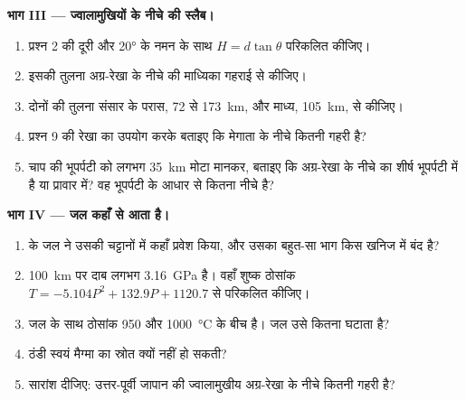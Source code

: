 \begin{problem}[{सप्ताहांत समस्या --- जापान के ज्वालामुखियों के नीचे}]
\medskip
\noindent\textbf{भाग III --- ज्वालामुखियों के नीचे की स्लैब।}
\begin{enumerate}[resume]
  \item प्रश्न 2 की दूरी और \ang{20} के नमन के साथ $H = d\tan\theta$
        परिकलित कीजिए।
  \item इसकी तुलना अग्र-रेखा के नीचे की माध्यिका गहराई से कीजिए।
  \item दोनों की तुलना संसार के परास, 72 से \qty{173}{km}, और माध्य,
        \qty{105}{km}, से कीजिए।
  \item प्रश्न 9 की रेखा का उपयोग करके बताइए कि मेगाता के नीचे  कितनी गहरी है?
  \item चाप की भूपर्पटी को लगभग \qty{35}{km} मोटा मानकर, बताइए कि
        अग्र-रेखा के नीचे  का शीर्ष भूपर्पटी में है या प्रावार में? वह
        भूपर्पटी के आधार से कितना नीचे है?
\end{enumerate}

\medskip
\noindent\textbf{भाग IV --- जल कहाँ से आता है।}
\begin{enumerate}[resume]
  \item {} के जल ने उसकी चट्टानों में कहाँ प्रवेश किया, और उसका बहुत-सा भाग किस
        खनिज में बंद है?
  \item \qty{100}{km} पर दाब लगभग \qty{3.16}{GPa} है। वहाँ शुष्क ठोसांक
        $T = -5.104P^2 + 132.9P + 1120.7$ से परिकलित कीजिए।
  \item जल के साथ ठोसांक 950 और \qty{1000}{\celsius} के बीच है।
        जल उसे कितना घटाता है?
  \item ठंडी  स्वयं मैग्मा का स्रोत क्यों नहीं हो सकती?
  \item सारांश दीजिए: उत्तर-पूर्वी जापान की ज्वालामुखीय अग्र-रेखा के नीचे
         कितनी गहरी है?
\end{enumerate}
\end{problem}
